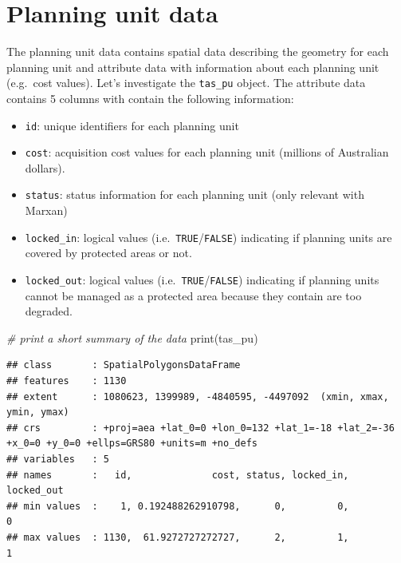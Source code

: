 \documentclass[
  12pt,
]{book}
\newenvironment{Shaded}{\begin{snugshade}}{\end{snugshade}}
\newcommand{\CommentTok}[1]{\textcolor[rgb]{0.56,0.35,0.01}{\textit{#1}}}
\newcommand{\FunctionTok}[1]{\textcolor[rgb]{0.00,0.00,0.00}{#1}}
\newcommand{\NormalTok}[1]{#1}
\providecommand{\tightlist}{%
  \setlength{\itemsep}{0pt}\setlength{\parskip}{0pt}}
\begin{document}
\clearpage

\hypertarget{planning-unit-data}{%
\section{Planning unit data}\label{planning-unit-data}}

The planning unit data contains spatial data describing the geometry for each planning unit and attribute data with information about each planning unit (e.g.~cost values). Let's investigate the \texttt{tas\_pu} object. The attribute data contains 5 columns with contain the following information:

\begin{itemize}
\tightlist
\item
  \texttt{id}: unique identifiers for each planning unit
\item
  \texttt{cost}: acquisition cost values for each planning unit (millions of Australian dollars).
\item
  \texttt{status}: status information for each planning unit (only relevant with Marxan)
\item
  \texttt{locked\_in}: logical values (i.e.~\texttt{TRUE}/\texttt{FALSE}) indicating if planning units are covered by protected areas or not.
\item
  \texttt{locked\_out}: logical values (i.e.~\texttt{TRUE}/\texttt{FALSE}) indicating if planning units cannot be managed as a protected area because they contain are too degraded.
\end{itemize}

\begin{Shaded}
\begin{Highlighting}[]
\CommentTok{\# print a short summary of the data}
\FunctionTok{print}\NormalTok{(tas\_pu)}
\end{Highlighting}
\end{Shaded}

\begin{verbatim}
## class       : SpatialPolygonsDataFrame 
## features    : 1130 
## extent      : 1080623, 1399989, -4840595, -4497092  (xmin, xmax, ymin, ymax)
## crs         : +proj=aea +lat_0=0 +lon_0=132 +lat_1=-18 +lat_2=-36 +x_0=0 +y_0=0 +ellps=GRS80 +units=m +no_defs 
## variables   : 5
## names       :   id,              cost, status, locked_in, locked_out 
## min values  :    1, 0.192488262910798,      0,         0,          0 
## max values  : 1130,  61.9272727272727,      2,         1,          1
\end{verbatim}
\end{document}
